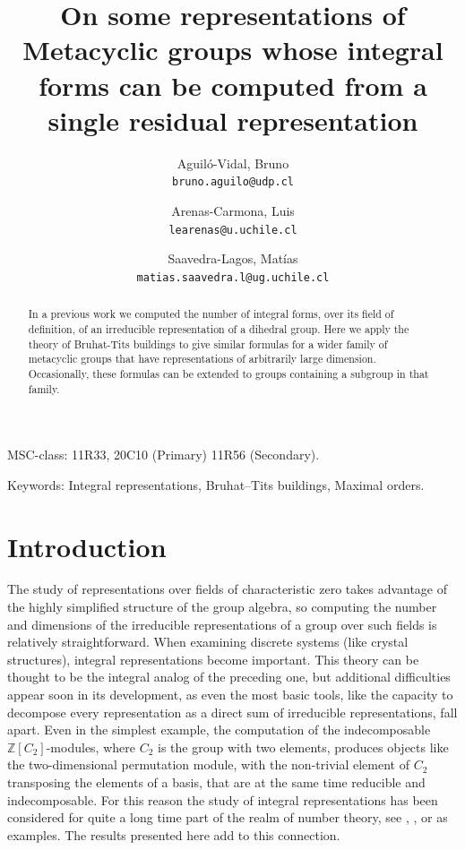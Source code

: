 \documentclass{article}
\title{On some representations of Metacyclic 
groups whose integral forms can be computed 
from a single residual representation}
\author{
  Aguil\'o-Vidal, Bruno\\
  \texttt{bruno.aguilo@udp.cl}
  \and
    Arenas-Carmona, Luis\\
  \texttt{learenas@u.uchile.cl}
  \and
  Saavedra-Lagos, Mat\'ias\\
  \texttt{matias.saavedra.l@ug.uchile.cl}
}
\theoremstyle{definition}
\begin{document}
\maketitle

\begin{abstract}
 In a previous work we computed the number of integral forms, over its field of 
definition, of an irreducible representation of a dihedral group. 
Here we apply the theory of Bruhat-Tits buildings to 
give similar formulas for a wider family of metacyclic groups that have 
representations of arbitrarily large dimension. Occasionally, these formulas 
can be extended to groups containing a subgroup in that family. 
\end{abstract}

MSC-class: 11R33, 20C10 (Primary)  11R56 (Secondary).

Keywords: Integral representations, Bruhat–Tits buildings, Maximal orders.


\section{Introduction}

 The study of representations over fields of characteristic zero takes
 advantage of the highly simplified structure of the group algebra, 
 so computing the number and dimensions of the irreducible representations 
 of a group over such fields is relatively straightforward.
 When examining discrete systems (like crystal structures), integral 
 representations become important. This theory can be thought to be the
integral analog of the preceding one, but additional difficulties
appear soon in its development, as even the most basic tools, like
the capacity to decompose every representation as a direct sum of
irreducible representations, fall apart. Even in the simplest
example, the computation of the indecomposable $\mathbb{Z}[C_2]$-modules,
where $C_2$ is the group with two elements, produces objects
like the two-dimensional permutation module, with the non-trivial element 
of $C_2$ transposing the elements of a basis, that are at the same time
reducible and indecomposable. For this reason the study of integral 
representations has been considered for quite a long time part of the realm of 
number theory, see \cite{cli92}, \cite{HR62a}, \cite{Hoff16} or
\cite{Mill14} as examples. The results presented here add to 
this connection.
\end{document}
